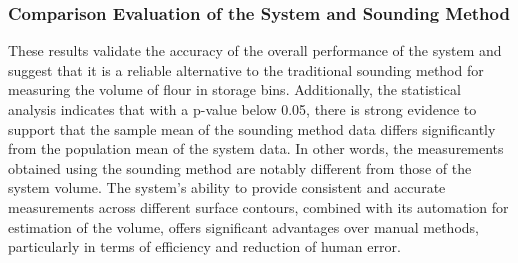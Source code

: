 

\subsubsection{Comparison Evaluation of the System and Sounding Method}

These results validate the accuracy of the overall performance of the system and suggest that it is a reliable alternative to the traditional sounding method for measuring the volume of flour in storage bins. Additionally, the statistical analysis indicates that with a p-value below 0.05, there is strong evidence to support that the sample mean of the sounding method data differs significantly from the population mean of the system data. In other words, the measurements obtained using the sounding method are notably different from those of the system volume. The system's ability to provide consistent and accurate measurements across different surface contours, combined with its automation for estimation of the volume, offers significant advantages over manual methods, particularly in terms of efficiency and reduction of human error.



